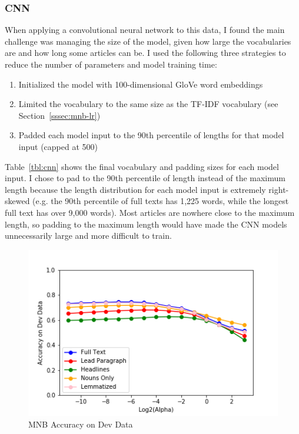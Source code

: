 \documentclass[11pt,a4paper,table]{article}
\begin{document}
\subsubsection{CNN}
\label{sssec:cnn}

When applying a convolutional neural network to this data, I found the main challenge was managing the size of the model, given how large the vocabularies are and how long some articles can be. I used the following three strategies to reduce the number of parameters and model training time:

\begin{enumerate}
\item Initialized the model with 100-dimensional GloVe word embeddings \cite{GloVe}
\item Limited the vocabulary to the same size as the TF-IDF vocabulary (see Section~\ref{sssec:mnb-lr})
\item Padded each model input to the 90th percentile of lengths for that model input (capped at 500)
\end{enumerate}

Table~\ref{tbl:cnn} shows the final vocabulary and padding sizes for each model input. I chose to pad to the 90th percentile of length instead of the maximum length because the length distribution for each model input is extremely right-skewed (e.g. the 90th percentile of full texts has 1,225 words, while the longest full text has over 9,000 words). Most articles are nowhere close to the maximum length, so padding to the maximum length would have made the CNN models unnecessarily large and more difficult to train.

\begin{figure}
\centering
\includegraphics[scale=0.57]{mnb_accuracy}
\caption{MNB Accuracy on Dev Data}
\label{fig:mnb-acc}
\end{figure}
\end{document}
